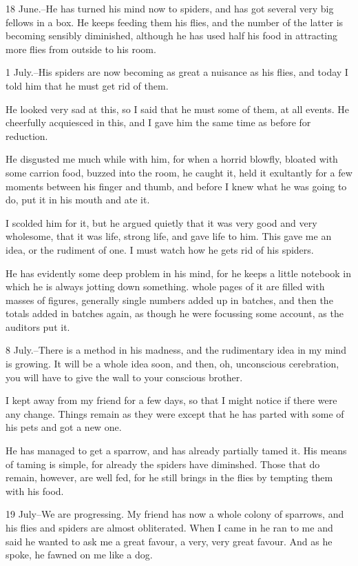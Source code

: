 18 June.--He has turned his mind now to spiders, and has got several very big fellows in a box. He keeps feeding them his flies, and the number of the latter is becoming sensibly diminished, although he has used half his food in attracting more flies from outside to his room. 

1 July.--His spiders are now becoming as great a nuisance as his flies, and today I told him that he must get rid of them. 

He looked very sad at this, so I said that he must some of them, at all events. He cheerfully acquiesced in this, and I gave him the same time as before for reduction. 

He disgusted me much while with him, for when a horrid blowfly, bloated with some carrion food, buzzed into the room, he caught it, held it exultantly for a few moments between his finger and thumb, and before I knew what he was going to do, put it in his mouth and ate it. 

I scolded him for it, but he argued quietly that it was very good and very wholesome, that it was life, strong life, and gave life to him. This gave me an idea, or the rudiment of one. I must watch how he gets rid of his spiders. 

He has evidently some deep problem in his mind, for he keeps a little notebook in which he is always jotting down something. whole pages of it are filled with masses of figures, generally single numbers added up in batches, and then the totals added in batches again, as though he were focussing some account, as the auditors put it. 

8 July.--There is a method in his madness, and the rudimentary idea in my mind is growing. It will be a whole idea soon, and then, oh, unconscious cerebration, you will have to give the wall to your conscious brother. 

I kept away from my friend for a few days, so that I might notice if there were any change. Things remain as they were except that he has parted with some of his pets and got a new one. 

He has managed to get a sparrow, and has already partially tamed it. His means of taming is simple, for already the spiders have diminshed. Those that do remain, however, are well fed, for he still brings in the flies by tempting them with his food. 

19 July--We are progressing. My friend has now a whole colony of sparrows, and his flies and spiders are almost obliterated. When I came in he ran to me and said he wanted to ask me a great favour, a very, very great favour. And as he spoke, he fawned on me like a dog. 

